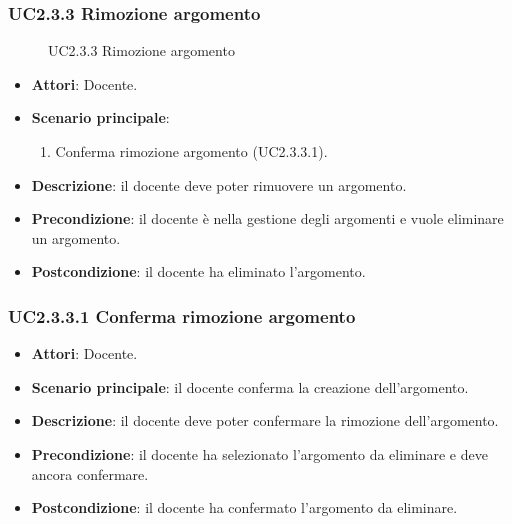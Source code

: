 \subsubsection{UC2.3.3 Rimozione argomento}
\begin{figure}[H]
\centering
\noindent{}
\caption{UC2.3.3 Rimozione argomento}
\end{figure}
\begin{itemize}
\item \textbf{Attori}: Docente.
\item \textbf{Scenario principale}:
\begin{enumerate}
\item Conferma rimozione argomento (UC2.3.3.1).
\end{enumerate}
\item \textbf{Descrizione}: il docente deve poter rimuovere un argomento.
\item \textbf{Precondizione}: il docente è nella gestione degli argomenti e vuole eliminare un argomento.
\item \textbf{Postcondizione}: il docente ha eliminato l’argomento.
\end{itemize}
\subsubsection{UC2.3.3.1 Conferma rimozione argomento}
\begin{itemize}
\item \textbf{Attori}: Docente.
\item \textbf{Scenario principale}: il docente conferma la creazione dell'argomento.
\item \textbf{Descrizione}: il docente deve poter confermare la rimozione dell'argomento.
\item \textbf{Precondizione}: il docente ha selezionato l'argomento da eliminare e deve ancora confermare.
\item \textbf{Postcondizione}: il docente ha confermato l'argomento da eliminare.
\end{itemize}
